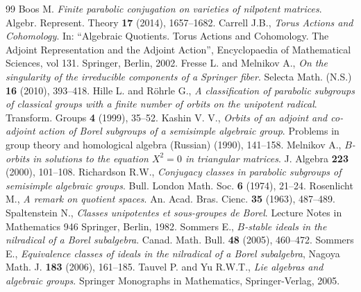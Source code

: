 \documentclass[10pt,a4paper]{amsart}
\numberwithin{equation}{section}
\theoremstyle{plain}
\theoremstyle{definition}
\theoremstyle{remark}
\begin{document}
\begin{thebibliography}{99}
 Boos M. \textit{Finite parabolic conjugation on varieties of nilpotent matrices}.
Algebr. Represent. Theory {\bf 17} (2014), 1657--1682.
 Carrell J.B., \textit{Torus Actions and Cohomology}. In: ``Algebraic Quotients. Torus Actions and Cohomology. The Adjoint Representation and the Adjoint Action'', Encyclopaedia of Mathematical Sciences, vol 131.
Springer, Berlin, 2002.
 Fresse L. and Melnikov A., \textit{On the singularity of the irreducible components of a Springer fiber}. Selecta Math. (N.S.) {\bf 16} (2010), 393--418.
 Hille L. and R\"ohrle G., \textit{A classification of parabolic subgroups of classical groups with
a finite number of orbits on the unipotent radical}. Transform. Groups {\bf 4} (1999), 35--52.
 Kashin V. V., \textit{Orbits of an adjoint and co-adjoint action of Borel subgroups of a
semisimple algebraic group}. Problems in group theory and homological algebra (Russian)
(1990), 141--158.
 Melnikov A., \textit{$B$-orbits in solutions to the equation $X^{2}=0$ in triangular matrices}.
J. Algebra {\bf 223} (2000), 101--108.
 Richardson R.W., \textit{Conjugacy classes in parabolic subgroups of semisimple algebraic groups}.
Bull. London Math. Soc. {\bf 6} (1974), 21--24.
 Rosenlicht M., \textit{A remark on quotient spaces}.
An. Acad. Bras. Cienc. {\bf 35} (1963), 487--489.
 Spaltenstein N., \textit{Classes unipotentes et sous-groupes de Borel}.
Lecture Notes in Mathematics 946 Springer, Berlin, 1982.
 Sommers E., \textit{$B$-stable ideals in the nilradical of a Borel subalgebra}.
Canad. Math. Bull. {\bf 48} (2005), 460--472.
 Sommers E., \textit{Equivalence classes of ideals in the nilradical of a Borel subalgebra},
Nagoya Math. J. {\bf 183} (2006), 161--185.
 Tauvel P. and Yu R.W.T., \textit{Lie algebras and algebraic groups}.
Springer Monographs in Mathematics, Springer-Verlag, 2005.
\end{thebibliography}
\end{document}
